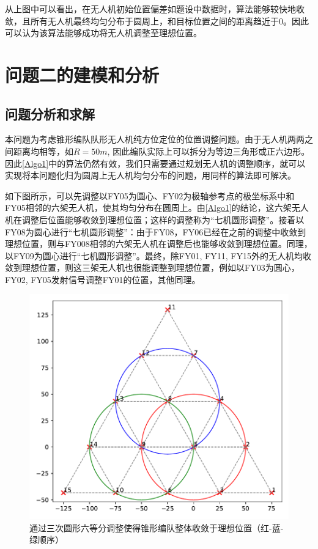 \documentclass[withoutpreface,bwprint]{cumcmthesis} %
\begin{document}
从上图中可以看出，在无人机初始位置偏差如题设中数据时，算法能够较快地收敛，且所有无人机最终均匀分布于圆周上，和目标位置之间的距离趋近于0。因此可以认为该算法能够成功将无人机调整至理想位置。




\section{问题二的建模和分析}
\subsection{问题分析和求解}
本问题为考虑锥形编队队形无人机纯方位定位的位置调整问题。由于无人机两两之间距离均相等，如$R=50m$, 因此编队实际上可以拆分为等边三角形或正六边形。因此\ref{Algo1}中的算法仍然有效，我们只需要通过规划无人机的调整顺序，就可以实现将本问题化归为圆周上无人机均匀分布的问题，用同样的算法即可解决。

如下图所示，可以先调整以FY05为圆心、FY02为极轴参考点的极坐标系中和FY05相邻的六架无人机，使其均匀分布在圆周上。由\ref{Algo1}的结论，这六架无人机在调整后位置能够收敛到理想位置；这样的调整称为“七机圆形调整”。接着以FY08为圆心进行“七机圆形调整”：由于FY08，FY06已经在之前的调整中收敛到理想位置，则与FY008相邻的六架无人机在调整后也能够收敛到理想位置。同理，以FY09为圆心进行“七机圆形调整”。最终，除FY01, FY11, FY15外的无人机均收敛到理想位置，则这三架无人机也很能调整到理想位置，例如以FY03为圆心，FY02, FY05发射信号调整FY01的位置，其他同理。
\begin{figure}[H]
    \centering
    \includegraphics[width=0.7\linewidth]{figures/T2_0.pdf}
    \caption{通过三次圆形六等分调整使得锥形编队整体收敛于理想位置（红-蓝-绿顺序）}
    \label{fig:tri_0}
\end{figure}
\end{document}
